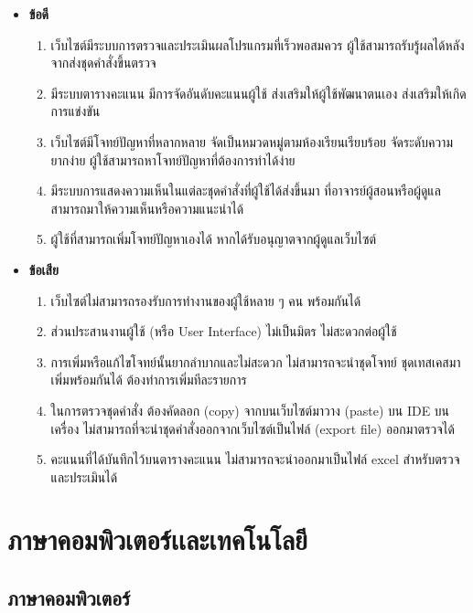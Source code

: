 \documentclass[12pt,oneside,openright,a4paper]{cpe-thai-project}
\begin{document}
    \begin{itemize}
        \item \textbf{ข้อดี}
        \begin{enumerate}
            \item เว็บไซต์มีระบบการตรวจและประเมินผลโปรแกรมที่เร็วพอสมควร ผู้ใช้สามารถรับรู้ผลได้หลังจากส่งชุดคำสั่งขึ้นตรวจ
            \item มีระบบตารางคะแนน มีการจัดอันดับคะแนนผู้ใช้ ส่งเสริมให้ผู้ใช้พัฒนาตนเอง ส่งเสริมให้เกิดการแข่งขัน
            \item เว็บไซต์มีโจทย์ปัญหาที่หลากหลาย จัดเป็นหมวดหมู่ตามห้องเรียนเรียบร้อย จัดระดับความยากง่าย ผู้ใช้สามารถหาโจทย์ปัญหาที่ต้องการทำได้ง่าย
            \item มีระบบการแสดงความเห็นในแต่ละชุดคำสั่งที่ผู้ใช้ได้ส่งขึ้นมา ที่อาจารย์ผู้สอนหรือผู้ดูแลสามารถมาให้ความเห็นหรือความแนะนำได้
            \item ผู้ใช้ที่สามารถเพิ่มโจทย์ปัญหาเองได้ หากได้รับอนุญาตจากผู้ดูแลเว็บไซต์
        \end{enumerate}
        \item \textbf{ข้อเสีย}
        \begin{enumerate}
            \item เว็บไซต์ไม่สามารถรองรับการทำงานของผู้ใช้หลาย ๆ คน พร้อมกันได้
            \item ส่วนประสานงานผู้ใช้ (หรือ User Interface) ไม่เป็นมิตร ไม่สะดวกต่อผู้ใช้
            \item การเพิ่มหรือแก้ไขโจทย์นั้นยากลำบากและไม่สะดวก ไม่สามารถจะนำชุดโจทย์ ชุดเทสเคสมาเพิ่มพร้อมกันได้ ต้องทำการเพิ่มทีละรายการ
            \item ในการตรวจชุดคำสั่ง ต้องคัดลอก (copy) จากบนเว็บไซต์มาวาง (paste) บน IDE บนเครื่อง ไม่สามารถที่จะนำชุดคำสั่งออกจากเว็บไซต์เป็นไฟล์ (export file) ออกมาตรวจได้
            \item คะแนนที่ได้บันทึกไว้บนตารางคะแนน ไม่สามารถจะนำออกมาเป็นไฟล์ excel สำหรับตรวจและประเมินได้
        \end{enumerate}
    \end{itemize}

\pagebreak
\section{ภาษาคอมพิวเตอร์เเละเทคโนโลยี}
    \subsection{ภาษาคอมพิวเตอร์}
\end{document}
